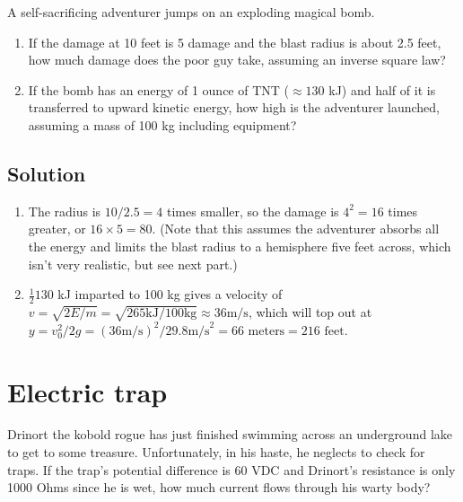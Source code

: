 \documentclass[12pt,letterpaper]{article}
\begin{document}
A self-sacrificing adventurer jumps on an exploding magical bomb.

\begin{enumerate}
\item If the damage at 10 feet is 5 damage and the blast radius is about 2.5 feet, how much damage does the poor guy take, assuming an inverse square law?
\item If the bomb has an energy of 1 ounce of TNT ($\approx 130$ kJ) and half of it is transferred to upward kinetic energy, how high is the adventurer launched, assuming a mass of 100 kg including equipment?
\end{enumerate}


\subsection{Solution}


\begin{enumerate}
\item The radius is $10/2.5 = 4$ times smaller, so the damage is $4^2 = 16$ times greater, or $16 \times 5 = 80$. (Note that this assumes the adventurer absorbs all the energy and limits the blast radius to a hemisphere five feet across, which isn't very realistic, but see next part.)
\item $\frac{1}{2} 130$ kJ imparted to 100 kg gives a velocity of $v = \sqrt{2 E/m} = \sqrt{2 65 \textrm{kJ} / 100 \textrm{kg}} \approx 36 \textrm{m/s}$, which will top out at $y = v_0^2 / 2g = (36 \textrm{m/s})^2/ 2 9.8 \textrm{m/s}^2 = 66 \textrm{ meters} = 216 \textrm{ feet}$.
\end{enumerate}

\section{Electric trap}


Drinort the kobold rogue has just finished swimming across an underground lake to get to some treasure. Unfortunately, in his haste, he neglects to check for traps. If the trap's potential difference is 60 VDC and Drinort's resistance is only 1000 Ohms since he is wet, how much current flows through his warty body?
\end{document}
